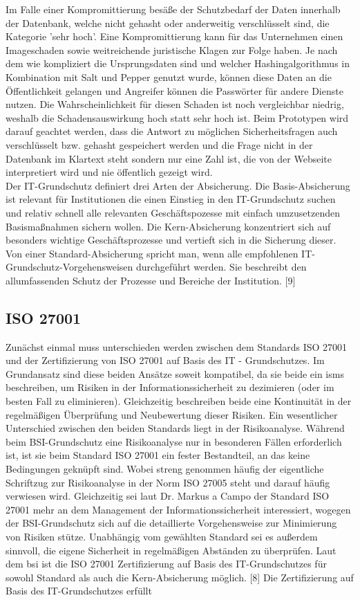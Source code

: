 Im Falle einer Kompromittierung besäße der Schutzbedarf der Daten innerhalb der Datenbank, welche nicht gehasht oder anderweitig verschlüsselt sind, die Kategorie 'sehr hoch'. Eine Kompromittierung kann für das Unternehmen einen Imageschaden sowie weitreichende juristische Klagen zur Folge haben. Je nach dem wie kompliziert die Ursprungsdaten sind und welcher Hashingalgorithmus in Kombination mit Salt und Pepper genutzt wurde, können diese Daten an die Öffentlichkeit gelangen und Angreifer können die Passwörter für andere Dienste nutzen. Die Wahrscheinlichkeit für diesen Schaden ist noch vergleichbar niedrig, weshalb die Schadensauswirkung hoch statt sehr hoch ist. Beim Prototypen wird darauf geachtet werden, dass die Antwort zu möglichen Sicherheitsfragen auch verschlüsselt bzw. gehasht gespeichert werden und die Frage nicht in der Datenbank im Klartext steht sondern nur eine Zahl ist, die von der Webseite interpretiert wird und nie öffentlich gezeigt wird. \\
Der IT-Grundschutz definiert drei Arten der Absicherung. Die Basis-Absicherung ist relevant für Institutionen die einen Einstieg in den IT-Grundschutz suchen und relativ schnell alle relevanten Geschäftspozesse mit einfach umzusetzenden Basismaßnahmen sichern wollen. Die Kern-Absicherung konzentriert sich auf besonders wichtige Geschäftsprozesse und vertieft sich in die Sicherung dieser. Von einer Standard-Absicherung spricht man, wenn alle empfohlenen IT-Grundschutz-Vorgehensweisen durchgeführt werden. Sie beschreibt den allumfassenden Schutz der Prozesse und Bereiche der Institution. [9]

\subsection{ISO 27001}
Zunächst einmal muss unterschieden werden zwischen dem Standards ISO 27001 und der Zertifizierung von ISO 27001 auf Basis des IT - Grundschutzes. Im Grundansatz sind diese beiden Ansätze soweit kompatibel, da sie beide ein \ac{isms} beschreiben, um Risiken in der Informationssicherheit zu dezimieren (oder im besten Fall zu eliminieren). Gleichzeitig beschreiben beide eine Kontinuität in der regelmäßigen Überprüfung und Neubewertung dieser Risiken. Ein wesentlicher Unterschied zwischen den beiden Standards liegt in der Risikoanalyse. Während beim BSI-Grundschutz eine Risikoanalyse nur in besonderen Fällen erforderlich ist, ist sie beim Standard ISO 27001 ein fester Bestandteil, an das keine Bedingungen geknüpft sind. Wobei streng genommen häufig der eigentliche Schriftzug zur Risikoanalyse in der Norm ISO 27005 steht und darauf häufig verwiesen wird. Gleichzeitig sei laut Dr. Markus a Campo der Standard ISO 27001 mehr an dem Management der Informationssicherheit interessiert, wogegen der BSI-Grundschutz sich auf die detaillierte Vorgehensweise zur Minimierung von Risiken stütze. Unabhängig vom gewählten Standard sei es außerdem sinnvoll, die eigene Sicherheit in regelmäßigen Abständen zu überprüfen.
Laut dem \ac{bsi} ist die ISO 27001 Zertifizierung auf Basis des IT-Grundschutzes für sowohl Standard als auch die Kern-Absicherung möglich. [8] Die Zertifizierung auf Basis des IT-Grundschutzes erfüllt

